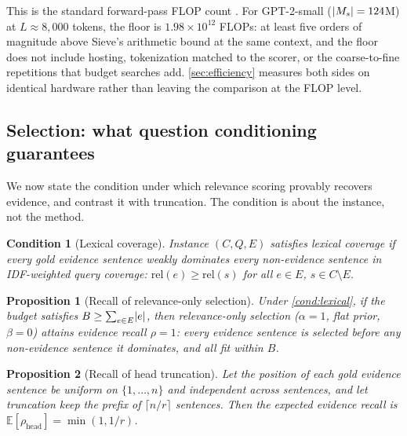 \documentclass[preprint,12pt]{elsarticle}
\DeclarePairedDelimiter\abs{\lvert}{\rvert}
\newtheorem{proposition}{Proposition}
\newtheorem{condition}{Condition}
\theoremstyle{remark}
\newcommand{\method}{Sieve}
\begin{document}
This is the standard forward-pass FLOP count \citep{kaplan2020scaling}.
For GPT-2-small ($\abs{M_s} = 124$M) at $L \approx 8{,}000$ tokens,
the floor is $1.98 \times 10^{12}$ FLOPs: at least five orders of
magnitude above \method{}'s arithmetic bound at the same context, and
the floor does not include hosting, tokenization matched to the
scorer, or the coarse-to-fine repetitions that budget searches add.
\autoref{sec:efficiency} measures both sides on identical hardware
rather than leaving the comparison at the FLOP level.

\subsection{Selection: what question conditioning guarantees}
\label{sec:guarantees}
We now state the condition under which relevance scoring provably
recovers evidence, and contrast it with truncation. The condition is
about the instance, not the method.

\begin{condition}[Lexical coverage]
\label{cond:lexical}
Instance $(C, Q, E)$ satisfies lexical coverage if every gold
evidence sentence weakly dominates every non-evidence sentence in
IDF-weighted query coverage:
$\mathrm{rel}(e) \ge \mathrm{rel}(s)$ for all $e \in E$,
$s \in C \setminus E$.
\end{condition}

\begin{proposition}[Recall of relevance-only selection]
\label{prop:relonly}
Under \autoref{cond:lexical}, if the budget satisfies
$B \ge \sum_{e \in E} \abs{e}$, then relevance-only selection
($\alpha=1$, flat prior, $\beta=0$) attains evidence recall $\rho=1$:
every evidence sentence is selected before any non-evidence sentence
it dominates, and all fit within $B$.
\end{proposition}

\begin{proposition}[Recall of head truncation]
\label{prop:head}
Let the position of each gold evidence sentence be uniform on
$\{1, \ldots, n\}$ and independent across sentences, and let
truncation keep the prefix of $\lceil n/r \rceil$ sentences. Then the
expected evidence recall is
$\mathbb{E}[\rho_{\mathrm{head}}] = \min(1, 1/r)$.
\end{proposition}
\end{document}
